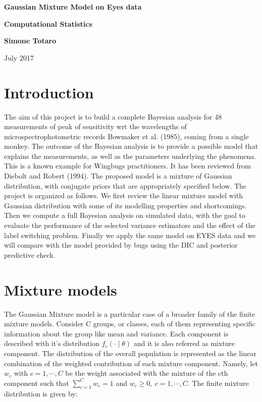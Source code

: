 \documentclass{article}
\begin{document}
\newcommand{\vect}[1]{\boldsymbol{#1}}
\begin{titlepage}

    \begin{center}
       \vspace*{1cm}
        
        \Huge
        \textbf{Gaussian Mixture Model on Eyes data}
        
        \vspace{0.5cm}
        \LARGE
        \textbf{Computational Statistics}
        
        \vspace{1.5cm}
        
        \textbf{Simone Totaro}
        
        \vfill
        
        July 2017
        
        \vspace{0.8cm}
    
    \end{center}
\end{titlepage}
\section{Introduction}
The aim of this project is to build a complete Bayesian analysis for 48 measurements of peak of sensitivity wrt the wavelengths of microspectrophotometric records Bowmaker et al. (1985), coming from a single monkey. The outcome of the Bayesian analysis is to provide a possible model that explains the measurements, as well as the parameters underlying the phenomena. This is a known example for Wingbugs practitioners. It has been reviewed from Diebolt and Robert (1994). The proposed model is a mixture of Gaussian distribution, with conjugate priors that are appropriately specified below. The project is organized as follows. We first review the linear mixture model with Gaussian distribution with some of its modelling properties and shortcomings. Then we compute a full Bayesian analysis on simulated data, with the goal to evaluate the performance of the selected variance estimators and the effect of the label switching problem. Finally we apply the same model on EYES data and we will compare with the model provided by bugs using the DIC and posterior predictive check. 

\section{Mixture models}
The Gaussian Mixture model is a particular case of a broader family of the finite mixture models. Consider C groups, or classes, each of them representing specific information about the group like mean and variance. Each component is described with it's distribution $f_c(\cdot \mid \theta)$ and it is also referred as mixture component. The distribution of the overall population is represented as the linear combination of the weighted contribution of each mixture component. Namely, let $w_c$ with $c = 1, \cdots ,C$ be the weight associated with the mixture of the cth component such that $\sum_{c = 1}^{C} w_c = 1$ and $w_c \geq 0,  \ c  = 1,\cdots,C$. The finite mixture distribution is given by:
\end{document}
